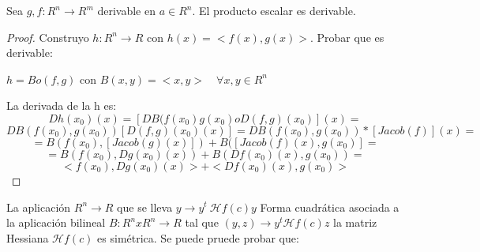 \begin{nprop}
	Sea $g,f: R^n \to R^m$ derivable en $a \in R^n$. El producto escalar es derivable.

\begin{proof}
		Construyo $h: R^n \to R$ con $h(x) = < f(x), g(x)>$. Probar que es derivable:

	$h = B o (f,g)$ con $B(x,y) = <x,y> \quad \forall x,y \in R^n$

	La derivada de la h es:
	\[
	Dh(x_0)(x) = [DB(f(x_0)g(x_0) o D(f,g)(x_0)](x) =\]\[DB(f(x_0),g(x_0))[D(f,g)(x_0)(x)] = DB(f(x_0),g(x_0))*[Jacob(f)](x) =
	\]
	\[
	= B(f(x_0),[Jacob(g)(x)]) + B([Jacob(f)(x), g(x_0)] = \]
	\[
	 = B(f(x_0),Dg(x_0)(x)) + B(Df(x_0)(x),g(x_0)) =
	\]
	\[
	<f(x_0),Dg(x_0)(x) > + < Df(x_0)(x),g(x_0)>
	\]
\end{proof}

\end{nprop}

\begin{nota}
	La aplicación $R^n \to R$ que se lleva $y \to y^t \ \mathcal{H}f(c)y$  Forma cuadrática asociada a la aplicación bilineal $B:R^nxR^n \to R$ tal que $(y,z) \to y^t\mathcal{H}f(c)z$ la matriz Hessiana $\mathcal{H}f(c)$ es simétrica. Se puede pruede probar que:


\end{nota}

